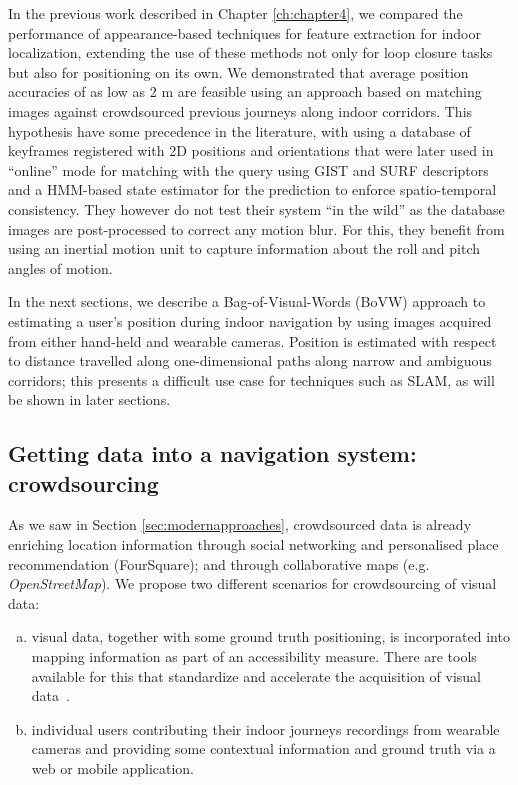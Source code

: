 
In the previous work \citep{RiveraWearable} described in Chapter \ref{ch:chapter4}, we compared the performance of appearance-based techniques for feature extraction for indoor localization, extending the use of these methods not only for loop closure tasks but also for positioning on its own. We demonstrated that average position accuracies of as low as 2 m are feasible using an approach based on matching images against crowdsourced previous journeys along indoor corridors. This hypothesis have some precedence in the literature, with \cite{liu2010video} using a database of keyframes registered with 2D positions and orientations that were later used in ``online'' mode for matching with the query using GIST and SURF descriptors and a HMM-based state estimator for the prediction to enforce spatio-temporal consistency. They however do not test their system ``in the wild'' as the database images are post-processed to correct any motion blur. For this, they benefit from using an inertial motion unit to capture information about the roll and pitch angles of motion. 

In the next sections, we describe a Bag-of-Visual-Words (BoVW) approach to estimating a user's position during indoor navigation by using images acquired from either hand-held and wearable cameras.  Position is estimated with respect to distance travelled along one-dimensional paths along narrow and ambiguous corridors; this presents a difficult use case for techniques such as SLAM, as will be shown in later sections.

\subsection{Getting data into a navigation system: crowdsourcing}
As we saw in Section \ref{sec:modernapproaches}, crowdsourced data is already enriching location information through social networking and personalised place recommendation (FourSquare); and through collaborative maps (e.g. {\it OpenStreetMap}). We propose two different scenarios for crowdsourcing of visual data:
\begin{enumerate}[a)] 
\item  visual data, together with some ground truth positioning, is incorporated into mapping information as part of an accessibility measure. There are tools available for this that standardize and accelerate the acquisition of visual data~\citep{navvisTrolley}.
\item individual users contributing their indoor journeys recordings from wearable cameras and providing some contextual information and ground truth via a web or mobile application. 
\end{enumerate}

